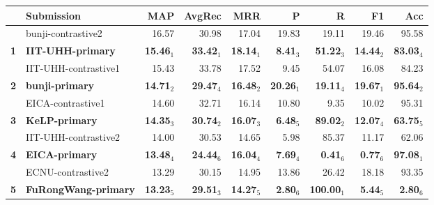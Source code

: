 \begin{table*}[tbh]
\begin{center}
\begin{tabular}{clrrrrrrr}
& \bf Submission & \bf MAP & \bf \scriptsize AvgRec & \bf \scriptsize MRR & \bf \scriptsize P & \bf \scriptsize R & \bf \scriptsize F1 & \bf \scriptsize Acc\\
\hline
& bunji-contrastive2 & 16.57 & \scriptsize 30.98 & \scriptsize 17.04 & \scriptsize 19.83 & \scriptsize 19.11 & \scriptsize 19.46 & \scriptsize 95.58 \\
\bf 1 & \bf IIT-UHH-primary & \bf 15.46$_{1}$ & \bf \scriptsize 33.42$_{1}$ & \bf \scriptsize 18.14$_{1}$ & \bf \scriptsize  8.41$_{3}$ & \bf \scriptsize 51.22$_{3}$ & \bf \scriptsize 14.44$_{2}$ & \bf \scriptsize 83.03$_{4}$ \\
& IIT-UHH-contrastive1 & 15.43 & \scriptsize 33.78 & \scriptsize 17.52 & \scriptsize  9.45 & \scriptsize 54.07 & \scriptsize 16.08 & \scriptsize 84.23 \\
\bf 2 & \bf bunji-primary & \bf 14.71$_{2}$ & \bf \scriptsize 29.47$_{4}$ & \bf \scriptsize 16.48$_{2}$ & \bf \scriptsize 20.26$_{1}$ & \bf \scriptsize 19.11$_{4}$ & \bf \scriptsize 19.67$_{1}$ & \bf \scriptsize 95.64$_{2}$ \\
& EICA-contrastive1 & 14.60 & \scriptsize 32.71 & \scriptsize 16.14 & \scriptsize 10.80 & \scriptsize  9.35 & \scriptsize 10.02 & \scriptsize 95.31 \\
\bf 3 & \bf KeLP-primary & \bf 14.35$_{3}$ & \bf \scriptsize 30.74$_{2}$ & \bf \scriptsize 16.07$_{3}$ & \bf \scriptsize  6.48$_{5}$ & \bf \scriptsize 89.02$_{2}$ & \bf \scriptsize 12.07$_{4}$ & \bf \scriptsize 63.75$_{5}$ \\
& IIT-UHH-contrastive2 & 14.00 & \scriptsize 30.53 & \scriptsize 14.65 & \scriptsize  5.98 & \scriptsize 85.37 & \scriptsize 11.17 & \scriptsize 62.06 \\
\bf 4 & \bf EICA-primary & \bf 13.48$_{4}$ & \bf \scriptsize 24.44$_{6}$ & \bf \scriptsize 16.04$_{4}$ & \bf \scriptsize  7.69$_{4}$ & \bf \scriptsize  0.41$_{6}$ & \bf \scriptsize  0.77$_{6}$ & \bf \scriptsize 97.08$_{1}$ \\
& ECNU-contrastive2 & 13.29 & \scriptsize 30.15 & \scriptsize 14.95 & \scriptsize 13.86 & \scriptsize 26.42 & \scriptsize 18.18 & \scriptsize 93.35 \\
\bf 5 & \bf FuRongWang-primary & \bf 13.23$_{5}$ & \bf \scriptsize 29.51$_{3}$ & \bf \scriptsize 14.27$_{5}$ & \bf \scriptsize  2.80$_{6}$ & \bf \scriptsize 100.00$_{1}$ & \bf \scriptsize  5.44$_{5}$ & \bf \scriptsize  2.80$_{6}$ \\

\end{tabular}
\end{center}
\end{table*}
